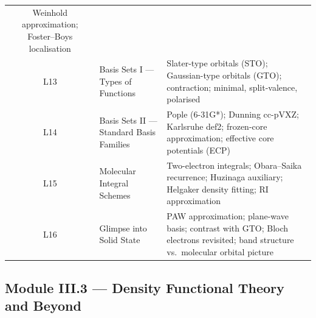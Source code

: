 \documentclass[11pt,a4paper]{article}
\begin{document}
\begin{tcolorbox}[chembox, title={Module~III.2 --- Lecture Overview (Electronic Hamiltonian)}]
\begin{longtable}{clp{7.2cm}}
      Weinhold approximation; Foster--Boys localisation\\
L13 & Basis Sets I --- Types of Functions &
      Slater-type orbitals (STO); Gaussian-type orbitals (GTO);
      contraction; minimal, split-valence, polarised\\
L14 & Basis Sets II --- Standard Basis Families &
      Pople (6-31G*); Dunning cc-pVXZ; Karlsruhe def2;
      frozen-core approximation; effective core potentials (ECP)\\
L15 & Molecular Integral Schemes &
      Two-electron integrals; Obara--Saika recurrence;
      Huzinaga auxiliary; Helgaker density fitting; RI approximation\\
L16 & Glimpse into Solid State &
      PAW approximation; plane-wave basis;
      contrast with GTO; Bloch electrons revisited;
      band structure vs.\ molecular orbital picture\\
\bottomrule
\end{longtable}
\end{tcolorbox}

\subsection{Module III.3 --- Density Functional Theory and Beyond}
\label{sec:mod-III3}
\end{document}
